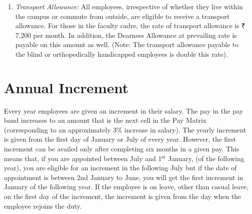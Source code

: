 \documentclass[
  10pt,
  a5paper,
  10pt,
  openany]{amsbook}
\begin{document}
\begin{enumerate}
  can claim HRA if the accommodation is rented or is owned. However, if
  either of them has a Government accommodation, HRA cannot be claimed
  by either). HRA is taxable. If, however, you live in a rented
  accommodation, the HRA that you receive may be fully or partially
  exempt from income tax. The amount of exemption that can be claimed is
  the least amount out of the following three: (i) the HRA received,
  (ii) rent that you actually paid over and above 10\% of your basic pay
  and (iii) 50\% of your basic salary.
\item
  \emph{Transport Allowance:} All employees, irrespective of whether
  they live within the campus or commute from outside, are eligible to
  receive a transport allowance. For those in the faculty cadre, the
  rate of transport allowance is ₹ 7,200 per month. In addition, the
  Dearness Allowance at prevailing rate is payable on this amount as
  well. (Note: The transport allowance payable to the blind or
  orthopedically handicapped employees is double this rate).
\end{enumerate}

\section{Annual Increment}\label{annual-increment}

Every year employees are given an increment in their salary. The pay in
the pay band increases to an amount that is the next cell in the Pay
Matrix (corresponding to an approximately 3\% increase in salary). The
yearly increment is given from the first day of January or July of every
year. However, the first increment can be availed only after completing
six months in a given pay. This means that, if you are appointed between
July and 1\(^{\text{st}}\) January, (of the following year), you are
eligible for an increment in the following July but if the date of
appointment is between 2nd January to June, you will get the first
increment in January of the following year. If the employee is on leave,
other than casual leave, on the first day of the increment, the
increment is given from the day when the employee rejoins the duty.
\end{document}
